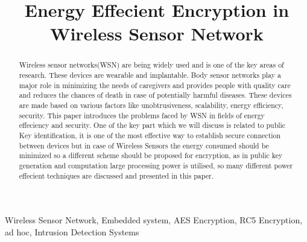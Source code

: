 \documentclass[conference]{IEEEtran}
\begin{document}
\title{Energy Effecient Encryption in Wireless Sensor Network}


\author{
}

\maketitle


\begin{abstract}
Wireless sensor networks(WSN) are being widely used and is one of the key areas of research. These devices are wearable and implantable. Body sensor networks play a major role in minimizing the needs of caregivers and provides people with quality care and reduces the chances of death in case of potentially harmful diseases. These devices are made based on various factors like unobtrusiveness, scalability, energy efficiency, security. This paper introduces the problems faced by WSN in fields of energy effeciency and security. One of the key part which we will discuss is related to public Key identification, it is one of the most effective way to establish secure connection between devices but in case of Wireless Sensors the energy consumed should be minimized so a different scheme should be proposed for encryption, as in public key generation and computation large processing power is utilised, so many different power effecient techniques are discussed and presented in this paper.
\end{abstract}

\begin{IEEEkeywords}
Wireless Sensor Network, Embedded system, AES Encryption, RC5 Encryption, ad hoc, Intrusion Detection Systems
\end{IEEEkeywords}

\IEEEpeerreviewmaketitle
\end{document}
